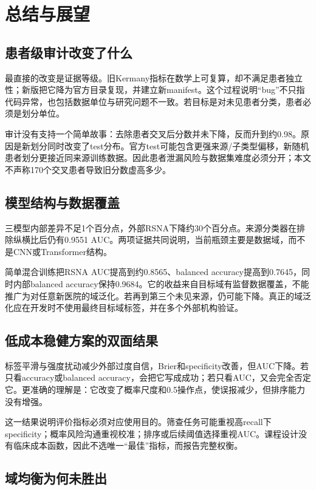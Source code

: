 \chapter{总结与展望}



\section{患者级审计改变了什么}

最直接的改变是证据等级。旧Kermany指标在数学上可复算，却不满足患者独立性；新版把它降为官方目录复现，并建立新manifest。这个过程说明“bug”不只指代码异常，也包括数据单位与研究问题不一致。若目标是对未见患者分类，患者必须是划分单位。

审计没有支持一个简单故事：去除患者交叉后分数并未下降，反而升到约0.98。原因是新划分同时改变了test分布。官方test可能包含更强来源/子类型偏移，新随机患者划分更接近同来源训练数据。因此患者泄漏风险与数据集难度必须分开；本文不声称170个交叉患者导致旧分数虚高多少。

\section{模型结构与数据覆盖}

三模型内部差异不足1个百分点，外部RSNA下降约30个百分点。来源分类器在排除纵横比后仍有0.9551 AUC。两项证据共同说明，当前瓶颈主要是数据域，而不是CNN或Transformer结构。

简单混合训练把RSNA AUC提高到约0.8565、balanced accuracy提高到0.7645，同时内部balanced accuracy保持0.9684。它的收益来自目标域有监督数据覆盖，不能推广为对任意新医院的域泛化。若再到第三个未见来源，仍可能下降。真正的域泛化应在开发时不使用最终目标域标签，并在多个外部机构验证。

\section{低成本稳健方案的双面结果}

标签平滑与强度扰动减少外部过度自信，Brier和specificity改善，但AUC下降。若只看accuracy或balanced accuracy，会把它写成成功；若只看AUC，又会完全否定它。更准确的理解是：它改变了概率尺度和0.5操作点，使误报减少，但排序能力没有增强。

这一结果说明评价指标必须对应使用目的。筛查任务可能重视高recall下specificity；概率风险沟通重视校准；排序或后续阈值选择重视AUC。课程设计没有临床成本函数，因此不选唯一“最佳”指标，而报告完整权衡。

\section{域均衡为何未胜出}

